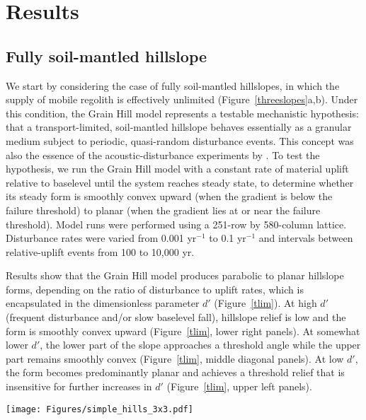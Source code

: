 \documentclass[esurf, manuscript]{copernicus}
\begin{document}
\section{Results}

\subsection{Fully soil-mantled hillslope}

We start by considering the case of fully soil-mantled hillslopes, in which the supply of mobile regolith is effectively unlimited (Figure~\ref{threeslopes}a,b). Under this condition, the Grain Hill model represents a testable mechanistic hypothesis: that a transport-limited, soil-mantled hillslope behaves essentially as a granular medium subject to periodic, quasi-random disturbance events. This concept was also the essence of the acoustic-disturbance experiments by \citet{roering2001hillslope}. To test the hypothesis, we run the Grain Hill model with a constant rate of material uplift relative to baselevel until the system reaches steady state, to determine whether its steady form is smoothly convex upward (when the gradient is below the failure threshold) to planar (when the gradient lies at or near the failure threshold). Model runs were performed using a 251-row by 580-column lattice. Disturbance rates were varied from 0.001 yr$^{-1}$ to 0.1 yr$^{-1}$ and intervals between relative-uplift events from 100 to 10,000 yr.  

Results show that the Grain Hill model produces parabolic to planar hillslope forms, depending on the ratio of disturbance to uplift rates, which is encapsulated in the dimensionless parameter $d'$ (Figure~\ref{tlim}). At high $d'$ (frequent disturbance and/or slow baselevel fall), hillslope relief is low and the form is smoothly convex upward (Figure~\ref{tlim}, lower right panels). At somewhat lower $d'$, the lower part of the slope approaches a threshold angle while the upper part remains smoothly convex (Figure~\ref{tlim}, middle diagonal panels). At low $d'$, the form becomes predominantly planar and achieves a threshold relief that is insensitive for further increases in $d'$ (Figure~\ref{tlim}, upper left panels).

\begin{figure*}[t]
\texttt{[image: Figures/simple\_hills\_3x3.pdf]}
\caption{Equilibrium topographic cross-sections using only regolith particles (no rock) and a variety of disturbance frequencies ($d$) and time interval between baselevel fall events ($\tau$). Fast basal incision and/or infrequent disturbance leads to planar threshold hillslopes; slow basal incision and/or frequent disturbance leads to parabolic hillslopes.}
\label{tlim}
\end{figure*}
\end{document}
